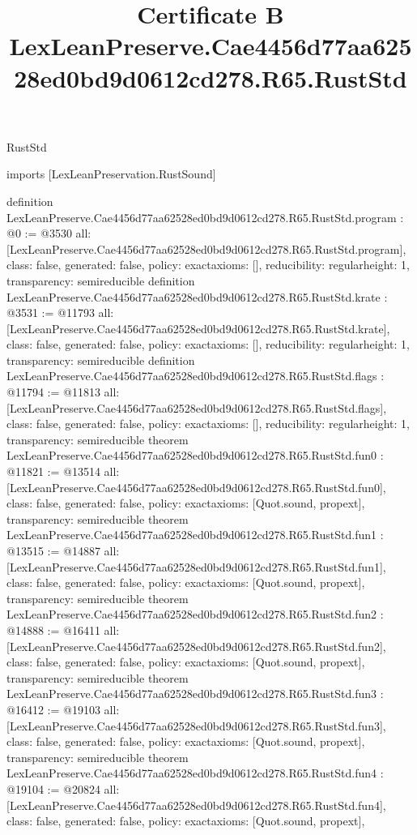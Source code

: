 \begin{lexlean}{RustStd}
\title{Certificate B LexLeanPreserve.Cae4456d77aa62528ed0bd9d0612cd278.R65.RustStd}
\begin{coremodule}
imports [LexLeanPreservation.RustSound]

definition LexLeanPreserve.Cae4456d77aa62528ed0bd9d0612cd278.R65.RustStd.program : @0 := @3530 {
  all: [LexLeanPreserve.Cae4456d77aa62528ed0bd9d0612cd278.R65.RustStd.program],
  class: false,
  generated: false,
  policy: exact{axioms: []},
  reducibility: regular{height: 1},
  transparency: semireducible
}
definition LexLeanPreserve.Cae4456d77aa62528ed0bd9d0612cd278.R65.RustStd.krate : @3531 := @11793 {
  all: [LexLeanPreserve.Cae4456d77aa62528ed0bd9d0612cd278.R65.RustStd.krate],
  class: false,
  generated: false,
  policy: exact{axioms: []},
  reducibility: regular{height: 1},
  transparency: semireducible
}
definition LexLeanPreserve.Cae4456d77aa62528ed0bd9d0612cd278.R65.RustStd.flags : @11794 := @11813 {
  all: [LexLeanPreserve.Cae4456d77aa62528ed0bd9d0612cd278.R65.RustStd.flags],
  class: false,
  generated: false,
  policy: exact{axioms: []},
  reducibility: regular{height: 1},
  transparency: semireducible
}
theorem LexLeanPreserve.Cae4456d77aa62528ed0bd9d0612cd278.R65.RustStd.fun0 : @11821 := @13514 {
  all: [LexLeanPreserve.Cae4456d77aa62528ed0bd9d0612cd278.R65.RustStd.fun0],
  class: false,
  generated: false,
  policy: exact{axioms: [Quot.sound, propext]},
  transparency: semireducible
}
theorem LexLeanPreserve.Cae4456d77aa62528ed0bd9d0612cd278.R65.RustStd.fun1 : @13515 := @14887 {
  all: [LexLeanPreserve.Cae4456d77aa62528ed0bd9d0612cd278.R65.RustStd.fun1],
  class: false,
  generated: false,
  policy: exact{axioms: [Quot.sound, propext]},
  transparency: semireducible
}
theorem LexLeanPreserve.Cae4456d77aa62528ed0bd9d0612cd278.R65.RustStd.fun2 : @14888 := @16411 {
  all: [LexLeanPreserve.Cae4456d77aa62528ed0bd9d0612cd278.R65.RustStd.fun2],
  class: false,
  generated: false,
  policy: exact{axioms: [Quot.sound, propext]},
  transparency: semireducible
}
theorem LexLeanPreserve.Cae4456d77aa62528ed0bd9d0612cd278.R65.RustStd.fun3 : @16412 := @19103 {
  all: [LexLeanPreserve.Cae4456d77aa62528ed0bd9d0612cd278.R65.RustStd.fun3],
  class: false,
  generated: false,
  policy: exact{axioms: [Quot.sound, propext]},
  transparency: semireducible
}
theorem LexLeanPreserve.Cae4456d77aa62528ed0bd9d0612cd278.R65.RustStd.fun4 : @19104 := @20824 {
  all: [LexLeanPreserve.Cae4456d77aa62528ed0bd9d0612cd278.R65.RustStd.fun4],
  class: false,
  generated: false,
  policy: exact{axioms: [Quot.sound, propext]},
}
\end{coremodule}
\end{lexlean}
